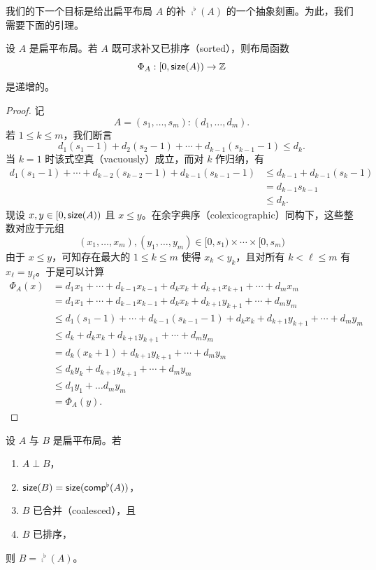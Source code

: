 \noindent 我们的下一个目标是给出扁平布局 $A$ 的补 $\comp^\flat(A)$ 的一个抽象刻画。为此，我们需要下面的引理。

\begin{lemma}\label{sortedcomplementablelayoutsareincreasing}
    设 $A$ 是扁平布局。若 $A$ 既可求补又已排序（sorted），则布局函数
    \[
    \Phi_A:[0,\mathsf{size}(A)) \to \mathbb{Z}
    \]
    是递增的。
\end{lemma}

\begin{proof}
    记
    \[
    A = (s_1,\dots,s_m):(d_1,\dots,d_m).
    \]
    若 $1 \leq k \leq m$，我们断言
    \[
    d_1(s_1-1) + d_2(s_2-1) + \cdots + d_{k-1}(s_{k-1}-1) \leq d_k.
    \]
    当 $k = 1$ 时该式空真（vacuously）成立，而对 $k$ 作归纳，有
    \begin{align*}
        d_1(s_1-1) + \cdots + d_{k-2}(s_{k-2}-1) + d_{k-1}(s_{k-1}-1) & \leq d_{k-1} + d_{k-1}(s_k-1)\\
        & = d_{k-1}s_{k-1}\\
        & \leq d_k.
    \end{align*}
    现设 $x,y \in [0,\mathsf{size}(A))$ 且 $x \leq y$。在余字典序（colexicographic）同构下，这些整数对应于元组
    \[(x_1,\dots,x_m),(y_1,\dots,y_m) \in [0,s_1) \times \cdots \times [0,s_m)\]
    由于 $x \leq y$，可知存在最大的 $1 \leq k \leq m$ 使得 $x_k<y_k$，且对所有 $k < \ell \leq m$ 有 $x_\ell = y_\ell$。于是可以计算
    \begin{align*}
    \Phi_A(x) & = d_1x_1 + \cdots + d_{k-1}x_{k-1} + d_k x_k + d_{k+1}x_{k+1} + \cdots + d_m x_m \\
    & = d_1x_1 + \cdots + d_{k-1}x_{k-1} + d_k x_k + d_{k+1}y_{k+1} + \cdots + d_m y_m\\
    & \leq d_1(s_1-1) + \cdots + d_{k-1}(s_{k-1}-1) + d_k x_k + d_{k+1}y_{k+1} + \cdots + d_m y_m\\
    & \leq d_k + d_kx_k + d_{k+1}y_{k+1} + \cdots + d_m y_m\\
    & = d_k(x_k+1) + d_{k+1}y_{k+1} + \cdots + d_m y_m\\
    & \leq d_ky_k +  d_{k+1}y_{k+1} + \cdots + d_m y_m\\
    & \leq d_1y_1 + \dots d_my_m\\
    & = \Phi_A(y).
    \end{align*}
\end{proof}

\begin{proposition}\label{characterizationofflatcomplement}
    设 $A$ 与 $B$ 是扁平布局。若
    \begin{enumerate}
        \item $A \perp B$，
        \item $\mathsf{size}(B) = \mathsf{size}(\mathsf{comp}^\flat(A))$，
        \item $B$ 已合并（coalesced），且
        \item $B$ 已排序，
    \end{enumerate}
    则 $B = \comp^\flat(A)$。
\end{proposition}




